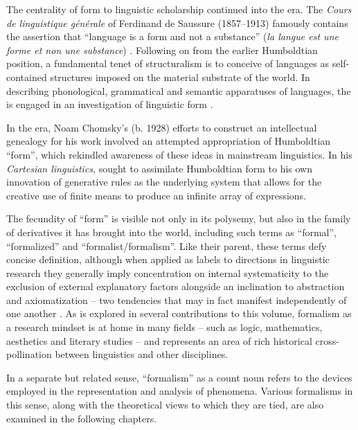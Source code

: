 \documentclass[output=paper]{langscibook}
\begin{document}
The centrality of form to linguistic scholarship continued into the  era. The \emph{Cours de linguistique générale} of Ferdinand de Saussure (1857--1913) famously contains the assertion that ``language is a form and not a substance'' (\emph{la langue est une forme et non une substance}) \citep[169]{Saussure19221916}. Following on from the earlier Humboldtian position, a fundamental tenet of structuralism is to conceive of languages as self-contained structures imposed on the material substrate of the world. In describing phonological, grammatical and semantic apparatuses of languages, the  is engaged in an investigation of linguistic form \citep[for a classical  account couched in these terms, see][54--70]{Lyons1968}.

In the  era, Noam Chomsky's (b. 1928) efforts to construct an intellectual genealogy for his work involved an attempted appropriation of Humboldtian ``form'', which  rekindled awareness of these ideas in mainstream linguistics. In his \emph{Cartesian linguistics}, \citet[69--77]{Chomsky20091966} sought to assimilate Humboldtian form to his own innovation of generative rules as the underlying system that allows for the creative use of finite means to produce an infinite array of expressions.

The fecundity of ``form'' is visible not only in its polysemy, but also in the family of derivatives it has brought into the world, including such terms as ``formal'', ``formalized'' and ``formalist/formalism''. Like their parent, these terms defy concise definition, although when applied as labels to directions in linguistic research they generally imply concentration on internal systematicity to the exclusion of external explanatory factors alongside an inclination to abstraction and axiomatization -- two tendencies that may in fact manifest independently of one another \citep[cf.][]{Newmeyer1998}. As is explored in several contributions to this volume, formalism as a research mindset is at home in many fields -- such as logic, mathematics, aesthetics and literary studies -- and represents an area of rich historical cross-pollination between linguistics and other disciplines. 

\largerpage[1]\label{p:pref:devices}In a separate but related sense, ``formalism'' as a count noun refers to the devices employed in the representation and analysis of phenomena. Various formalisms in this sense, along with the theoretical views to which they are tied, are also examined in the following chapters.
\end{document}
